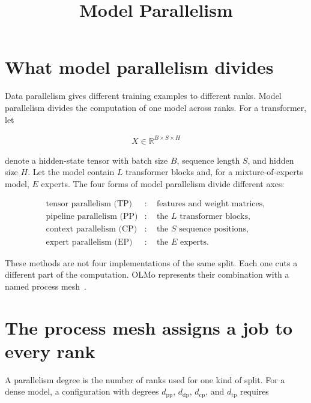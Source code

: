 \documentclass[11pt]{article}
\title{Model Parallelism}
\author{}
\date{}
\begin{document}
\maketitle
\tableofcontents
\newpage

\section{What model parallelism divides}

Data parallelism gives different training examples to different ranks. Model
parallelism divides the computation of one model across ranks. For a
transformer, let

\begin{equation}
\begin{split}
X\in\mathbb{R}^{B\times S\times H}
\end{split}
\end{equation}

denote a hidden-state tensor with batch size \(B\), sequence length \(S\), and
hidden size \(H\). Let the model contain \(L\) transformer blocks and, for a
mixture-of-experts model, \(E\) experts. The four forms of model parallelism
divide different axes:

\begin{equation}
\begin{split}
\text{tensor parallelism (TP)}&:\quad \text{features and weight matrices},\\
\text{pipeline parallelism (PP)}&:\quad \text{the }L\text{ transformer blocks},\\
\text{context parallelism (CP)}&:\quad \text{the }S\text{ sequence positions},\\
\text{expert parallelism (EP)}&:\quad \text{the }E\text{ experts}.
\end{split}
\end{equation}

These methods are not four implementations of the same split. Each one cuts a
different part of the computation. OLMo represents their combination with a
named process mesh~\cite{olmo-world-mesh}.

\newpage
\section{The process mesh assigns a job to every rank}

A parallelism degree is the number of ranks used for one kind of split. For a
dense model, a configuration with degrees \(d_{\mathrm{pp}}\),
\(d_{\mathrm{dp}}\), \(d_{\mathrm{cp}}\), and \(d_{\mathrm{tp}}\) requires
\end{document}
